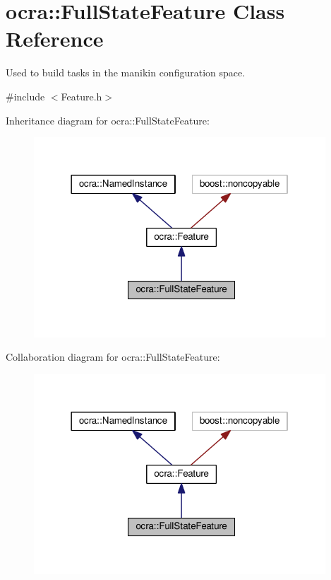 \hypertarget{classocra_1_1FullStateFeature}{}\section{ocra\+:\+:Full\+State\+Feature Class Reference}
\label{classocra_1_1FullStateFeature}


Used to build tasks in the manikin configuration space.  




{\ttfamily \#include $<$Feature.\+h$>$}



Inheritance diagram for ocra\+:\+:Full\+State\+Feature\+:
\nopagebreak
\begin{figure}[H]
\begin{center}
\leavevmode
\includegraphics[width=310pt]{d1/d91/classocra_1_1FullStateFeature__inherit__graph}
\end{center}
\end{figure}


Collaboration diagram for ocra\+:\+:Full\+State\+Feature\+:
\nopagebreak
\begin{figure}[H]
\begin{center}
\leavevmode
\includegraphics[width=310pt]{da/d00/classocra_1_1FullStateFeature__coll__graph}
\end{center}
\end{figure}
